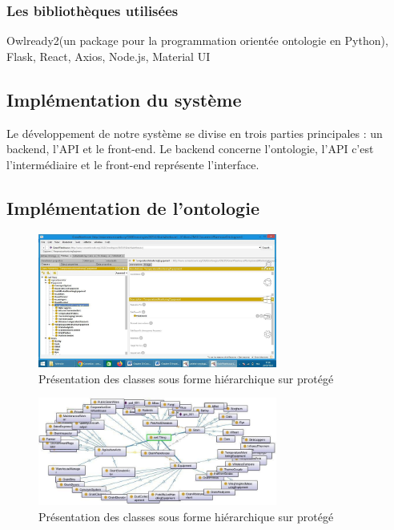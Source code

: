\documentclass{article}
\begin{document}
	\subsubsection{Les bibliothèques utilisées}
	Owlready2(un package pour la programmation orientée ontologie en Python), Flask, React, Axios, Node.js, Material UI
	
	\subsection{Implémentation du système}
	Le développement de notre système se divise en trois parties principales : un backend,
	l’API et le front-end.
	Le backend concerne l’ontologie, l’API c’est l’intermédiaire et le front-end représente
	l’interface.
	
	\subsection{Implémentation de l’ontologie}
	\begin{figure}[h]
		\centering
		\includegraphics[width=0.7\textwidth]{onto1.png}
		\caption{Présentation des classes sous forme hiérarchique sur protégé}
		\label{fig:votre_image}
	\end{figure}

	\begin{figure}[h]
		\centering
		\includegraphics[width=0.7\textwidth]{onto2.png}
		\caption{Présentation des classes sous forme hiérarchique sur protégé}
		\label{fig:votre_image}
	\end{figure}
\end{document}
